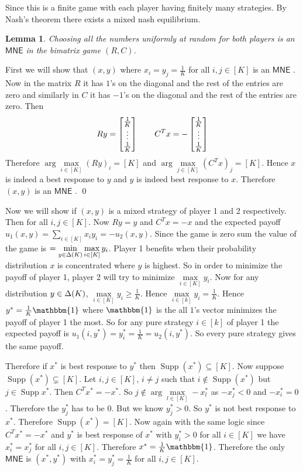 \documentclass[a4paper, 11pt]{article}
\newcommand{\mne}{\ensuremath{\mathsf{MNE}} }
\newtheorem{lemma}{Lemma}
\renewenvironment{proof}{\noindent{\it \textbf{Proof:}}\hspace*{1em}}{\qed\bigskip\\}
\DeclareMathOperator{\supp}{Supp}
\begin{document}
{Since this is a finite game with each player having finitely many strategies. By Nash's theorem there exists a mixed nash equilibrium. 
\begin{lemma}
	Choosing all the numbers uniformly at random for both players is an \mne in the bimatrix game $(R,C)$.
\end{lemma}
\begin{proof}
	First we will show that $(x,y)$ where $x_i=y_j=\frac1K$ for all $i,j\in[K]$ is an \mne. Now in the matrix $R$ it has $1$'s on the diagonal and the rest of the entries are zero and similarly in $C$ it has $-1$'s on the diagonal and the rest of the entries are zero. Then $$Ry=\left[\begin{matrix}\frac1K\\ \vdots\\ \frac1K\end{matrix}\right]\qquad C^Tx=-\left[\begin{matrix}\frac1K\\ \vdots\\ \frac1K\end{matrix}\right]$$Therefore $\arg\max\limits_{i\in [K]}(Ry)_i=[K]$ and $\arg\max\limits_{j\in [K]}(C^Tx)_j=[K]$. Hence $x$ is indeed a best response to $y$ and $y$ is indeed best response to $x$. Therefore $(x,y)$ is an \mne.
\end{proof}
	
	Now we will show if $(x,y)$ is a mixed strategy of player 1 and 2 respectively. Then  for all $i,j\in[K]$. Now $Ry=y$ and $C^Tx=-x$ and the expected payoff $u_1(x,y)=\sum\limits_{i\in[K]}x_iy_i=-u_2(x,y)$. Since the game is zero sum the value of the game  is $=\min\limits_{y\in \Delta(K)}\max\limits_{i\in[K]}y_i$. Player 1 benefits when their probability distribution $x$ is concentrated where $y$ is highest. So in order to minimize the payoff of player 1, player 2 will try to minimize $\max\limits_{i\in [K]}y_i$. Now for any distribution $y\in \Delta(K)$, $\max\limits_{i\in[K]}y_i\geq \frac1K$. Hence $\max\limits_{i\in[k]}y_i=\frac1K$. Hence $y^*=\frac1K\mathbbm{1}$ where $\mathbbm{1}$ is the all $1$'s vector  minimizes the payoff of player 1 the most. So for any pure strategy $i\in[k]$ of player 1 the expected payoff is $u_1(i,y^*)=y_i^*=\frac1K=u_2(i,y^*)$. So every pure strategy gives the same payoff.
	
	Therefore if $x^*$ is best response to $y^*$ then $\supp(x^*)\subseteq [K]$. Now suppose $\supp(x^*)\subsetneq [K]$. Let $i,j\in [K]$, $i\neq j$ such that  $i\notin \supp(x^*)$ but $j\in \supp{x^*}$. Then $C^Tx^*=-x^*$. So $j\notin\arg\max\limits_{l\in[K]}-x^*_l$ as $-x^*_j<0$ and $-x^*_i=0$. Therefore the $y^*_j$ has to be $0$. But we know $y^*_j>0$. So $y^*$ is not best response to $x^*$. Therefore $\supp(x^*)=[K]$. Now again with the same logic since $C^Tx^*=-x^*$ and $y^*$ is best response of $x^*$ with $y_i^*>0$ for all $i\in[K]$ we have $x^*_i=x^*_j$ for all $i,j\in[K]$. Therefore $x^*=\frac1K\mathbbm{1}$. Therefore the only \mne is $(x^*,y^*)$ with $x_i^*=y_j^*=\frac1K$ for all $i,j\in[K]$.
}
\end{document}
